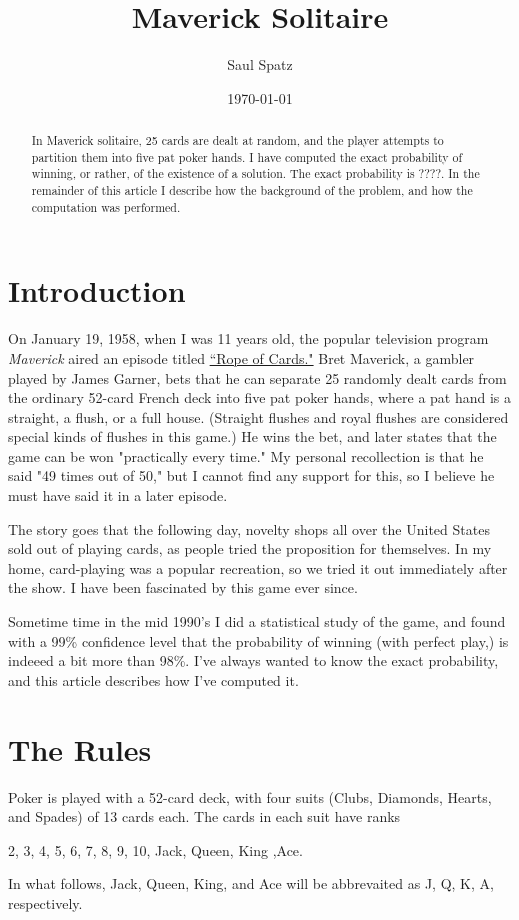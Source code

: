 \documentclass [12pt, letterpaper] {article}
\title {Maverick Solitaire}
\author {Saul Spatz}
\date {\today}
\begin{document}
\maketitle
\begin {abstract}
In Maverick solitaire, 25 cards are dealt at random, 
and the player attempts to partition them into five pat 
poker hands.  I have computed the exact probability of
winning, or rather, of the existence of a solution.  
The exact probability is ????.  In the remainder of this
article I describe how the background of the problem, and
how the computation was performed.   
\end {abstract}
\section{Introduction}
On January 19, 1958, when I was 11 years old, the popular television program 
\textit{Maverick} aired an episode titled 
\href{https://www.imdb.com/title/tt0644480/}{``Rope of Cards."} 
Bret Maverick, a gambler played by James Garner, bets that 
he can separate 25 randomly dealt cards from the ordinary 52-card 
French deck into five pat poker hands, where a pat hand is a 
straight, a flush, or a full house.  (Straight flushes and royal
flushes are considered special kinds of flushes in this game.)
He wins the bet, and later  states that the game can be won
"practically every time."  My personal recollection is that
he said "49 times out of 50," but I cannot find any support
for this, so I believe he must have said it in a later episode.

The story goes that the following day, novelty shops all over the
United States sold out of playing cards, as people tried the 
proposition for themselves.  In my home, card-playing was a popular
recreation, so we tried it out immediately after the show.  I have been
fascinated by this game ever since.  

Sometime time in the mid 1990's I did a statistical study of the game, and
found with a 99\% confidence level that the probability of winning 
(with perfect play,) is indeeed a bit more than 98\%.  I've always wanted 
to know the exact probability, and this article describes how I've computed it.

\section {The Rules}
Poker is played with a 52-card deck, with four suits (Clubs, Diamonds, Hearts, and Spades)
of 13 cards each.  The cards in each suit have ranks 
\begin{center}
         2, 3, 4, 5, 6, 7, 8, 9, 10, Jack, Queen, King ,Ace.
\end{center}
In what follows, Jack, Queen, King, and Ace will be abbrevaited as J, Q, K, A, respectively. 
\end{document}
